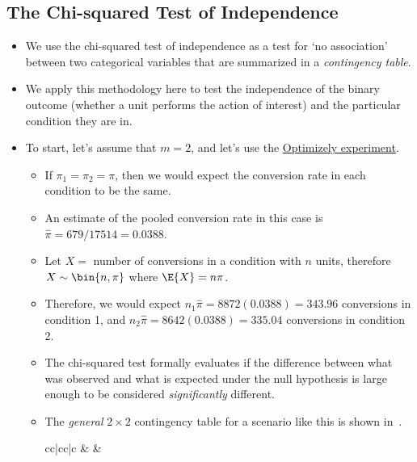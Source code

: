 \subsection{The Chi-squared Test of Independence}
\begin{itemize}
      \item We use the chi-squared test of independence as a test for `no association'
            between two categorical variables that are summarized in a \emph{contingency table}.
      \item We apply this methodology here to test the independence of the binary outcome
            (whether a unit performs the action of interest) and the particular condition they are in.
      \item To start, let's assume that $ m=2 $, and let's use the \hyperref[ex:optimizely_ex1]{Optimizely experiment}.
            \begin{itemize}
                  \item If $ \pi_1=\pi_2=\pi $, then we would expect the conversion rate in each condition to be the same.
                  \item An estimate of the pooled conversion rate in this case is $ \hat{\pi}=679/17514=0.0388 $.
                  \item Let $ X= $ number of conversions in a condition with $ n $ units, therefore $ X \sim \bin{n,\pi} $
                        where $ \E{X}=n\pi $.
                  \item Therefore, we would expect $ n_1\hat{\pi}=8872(0.0388)=343.96 $ conversions in condition 1,
                        and $ n_2\hat{\pi}=8642(0.0388)=335.04 $ conversions in condition 2.
                  \item The chi-squared test formally evaluates if the difference between what
                        was observed and what is expected under the null hypothesis is large enough
                        to be considered \emph{significantly} different.
                  \item The \emph{general} $ 2\times 2 $ contingency table for a scenario like this
                        is shown in~.
                        \begin{table}[!htbp]
                              \centering
                              \caption{A General $ 2\times 2 $ Contingency Table}\label{general_22_contingency}
                              \begin{NiceTabular}{cc|cc|c}
                                            &  &                                                                                       \\

\end{NiceTabular}
\end{table}
\end{itemize}
\end{itemize}
